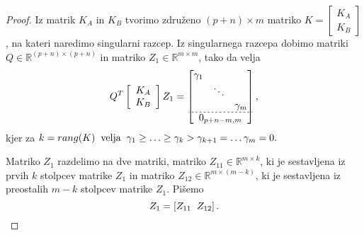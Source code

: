 \documentclass[mat1]{article}
\theoremstyle{definition}
\begin{document}
\begin{proof}

Iz matrik $K_A$ in $K_B$ tvorimo združeno $(p+n)\times m$ matriko $K = \left[\begin{array}{c} K_A \\ K_B \end{array}\right]$, na kateri naredimo singularni razcep. Iz singularnega razcepa dobimo matriki $Q \in \mathbb{R}^{(p+n) \times (p+n)}$ in matriko $Z_1 \in \mathbb{R}^{m \times m}$, tako da velja 
\begin{equation}
Q^T \left[\begin{array}{c} K_A \\ K_B \end{array}\right] Z_1 = 
\begin{bmatrix}
\begin{matrix}
\gamma_1 & & \\
 & \ddots & \\
 & & \gamma_m
\end{matrix} \\ \hdashline[2pt/2pt]
0_{p+n-m, m}
\end{bmatrix} 
\text{,}
\label{eq:1}
\end{equation}
kjer za
$
k = rang(K) \hspace{2mm} \text{velja} \hspace{2mm} 
\gamma_1 \geq \ldots \geq \gamma_k > \gamma_{k+1} = \ldots \gamma_m = 0\text{.} $

Matriko $Z_1$ razdelimo na dve matriki, matriko $Z_{11} \in \mathbb{R}^{m \times k}$, ki je sestavljena iz prvih $k$ stolpcev matrike $Z_1$ in matriko $Z_{12} \in \mathbb{R}^{m \times (m-k)}$, ki je sestavljena iz preostalih $m-k$ stolpcev matrike $Z_1$. Pišemo $$Z_1 = \left[ Z_{11} \hspace{2mm} Z_{12} \right] \text{.}$$


\end{proof}
\end{document}
